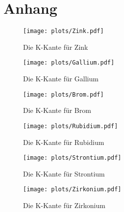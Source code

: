 \section{Anhang}
\label{sec:Anhang}
\begin{figure}
    \centering
    \texttt{[image: plots/Zink.pdf]}
    \caption{Die K-Kante für Zink}
    \label{fig:Zink}
\end{figure}

\begin{figure}
    \centering
    \texttt{[image: plots/Gallium.pdf]}
    \caption{Die K-Kante für Gallium}
    \label{fig:Gallium}
\end{figure}

\begin{figure}
    \centering
    \texttt{[image: plots/Brom.pdf]}
    \caption{Die K-Kante für Brom}
    \label{fig:Brom}
\end{figure}

\begin{figure}
    \centering
    \texttt{[image: plots/Rubidium.pdf]}
    \caption{Die K-Kante für Rubidium}
    \label{fig:Rubidium}
\end{figure}

\begin{figure}
    \centering
    \texttt{[image: plots/Strontium.pdf]}
    \caption{Die K-Kante für Strontium}
    \label{fig:Strontium}
\end{figure}

\begin{figure}
    \centering
    \texttt{[image: plots/Zirkonium.pdf]}
    \caption{Die K-Kante für Zirkonium}
    \label{fig:Zirkonium}
\end{figure}
